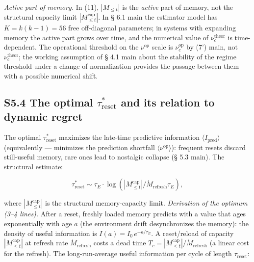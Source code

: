 \documentclass[pdflatex,sn-mathphys-ay]{sn-jnl}
\begin{document}
\emph{Active part of memory.} In (11), \(|M_{\le t}|\) is the \emph{active} part of memory, not the structural capacity limit \(|M_{\le t}^{\text{cap}}|\). In § 6.1 main the estimator model has \(K = k(k-1) = 56\) free off-diagonal parameters; in systems with expanding memory the active part grows over time, and the numerical value of \(\nu_c^{\text{theor}}\) is time-dependent. The operational threshold on the \(\nu^{\text{op}}\) scale is \(\nu_c^{\text{op}}\) by (7') main, not \(\nu_c^{\text{theor}}\); the working assumption of § 4.1 main about the stability of the regime threshold under a change of normalization provides the passage between them with a possible numerical shift.



\subsection*{\texorpdfstring{S5.4 The optimal \(\tau_{\text{reset}}^*\) and its relation to dynamic regret}{S5.4 The optimal \textbackslash tau\_\{\textbackslash text\{reset\}\}\^{}* and its relation to dynamic regret}}\label{s5.4-the-optimal-tau_textreset-and-its-relation-to-dynamic-regret}



The optimal \(\tau_{\text{reset}}^*\) maximizes the late-time predictive information \(\langle I_{\text{pred}}\rangle\) (equivalently --- minimizes the prediction shortfall \(\langle\nu^{\text{op}}\rangle\)): frequent resets discard still-useful memory, rare ones lead to nostalgic collapse (§ 5.3 main). The structural estimate:



\[\tau_{\text{reset}}^* \sim \tau_E \cdot \log(|M_{\le t}^{\text{cap}}|/\dot{M}_{\text{refresh}} \tau_E),\]



where \(|M_{\le t}^{\text{cap}}|\) is the structural memory-capacity limit. \emph{Derivation of the optimum (3--4 lines).} After a reset, freshly loaded memory predicts with a value that ages exponentially with age \(a\) (the environment drift desynchronizes the memory): the density of useful information is \(I(a) = I_0\,e^{-a/\tau_E}\). A reset/reload of capacity \(|M_{\le t}^{\text{cap}}|\) at refresh rate \(\dot M_{\text{refresh}}\) costs a dead time \(T_c = |M_{\le t}^{\text{cap}}|/\dot M_{\text{refresh}}\) (a linear cost for the refresh). The long-run-average useful information per cycle of length \(\tau_{\text{reset}}\):
\end{document}
